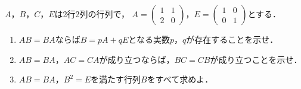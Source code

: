 \documentclass[../../main.tex]{subfiles}
\begin{document}
$A$，$B$，$C$，$E$は2行2列の行列で，
$A=
\begin{pmatrix} 1 & 1 \\ 2 & 0
\end{pmatrix}$，$E=
\begin{pmatrix} 1 & 0 \\ 0 & 1
\end{pmatrix}$とする．
\begin{enumerate}
  \item $AB=BA$ならば$B=pA+qE$となる実数$p$，$q$が存在することを示せ．
  \item $AB=BA$，$AC=CA$が成り立つならば，$BC=CB$が成り立つことを示せ．
  \item $AB=BA$，$B^2=E$を満たす行列$B$をすべて求めよ．
\end{enumerate}
\end{document}
